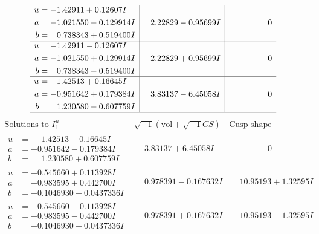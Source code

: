 \documentclass[1p]{elsarticle_modified}
\theoremstyle{definition}
\newcommand{\I}{\sqrt{-1}}
\begin{document}
$$\begin{array}{c|c|c}
\begin{aligned}
u &= -1.42911 + 0.12607 I \\
a &= -1.021550 - 0.129914 I \\
b &= \phantom{-}0.738343 + 0.519400 I\end{aligned}
 & \phantom{-}2.22829 - 0.95699 I & \phantom{-0.000000 } 0 \\ \hline\begin{aligned}
u &= -1.42911 - 0.12607 I \\
a &= -1.021550 + 0.129914 I \\
b &= \phantom{-}0.738343 - 0.519400 I\end{aligned}
 & \phantom{-}2.22829 + 0.95699 I & \phantom{-0.000000 } 0 \\ \hline\begin{aligned}
u &= \phantom{-}1.42513 + 0.16645 I \\
a &= -0.951642 + 0.179384 I \\
b &= \phantom{-}1.230580 - 0.607759 I\end{aligned}
 & \phantom{-}3.83137 - 6.45058 I & \phantom{-0.000000 } 0\\
 \hline 
 \end{array}$$\newpage$$\begin{array}{c|c|c}  
\text{Solutions to }I^u_{1}& \I (\text{vol} + \sqrt{-1}CS) & \text{Cusp shape}\\
 \hline 
\begin{aligned}
u &= \phantom{-}1.42513 - 0.16645 I \\
a &= -0.951642 - 0.179384 I \\
b &= \phantom{-}1.230580 + 0.607759 I\end{aligned}
 & \phantom{-}3.83137 + 6.45058 I & \phantom{-0.000000 } 0 \\ \hline\begin{aligned}
u &= -0.545660 + 0.113928 I \\
a &= -0.983595 + 0.442700 I \\
b &= -0.1046930 - 0.0437336 I\end{aligned}
 & \phantom{-}0.978391 - 0.167632 I & \phantom{-}10.95193 + 1.32595 I \\ \hline\begin{aligned}
u &= -0.545660 - 0.113928 I \\
a &= -0.983595 - 0.442700 I \\
b &= -0.1046930 + 0.0437336 I\end{aligned}
 & \phantom{-}0.978391 + 0.167632 I & \phantom{-}10.95193 - 1.32595 I \\ \hline\begin{aligned}

\end{aligned}
\end{array}$$
\end{document}
